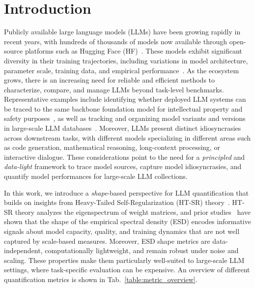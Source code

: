 \section{Introduction}\label{sec:intro}

Publicly available large language models (LLMs) have been growing rapidly in recent years, with hundreds of thousands of models now available through open-source platforms such as Hugging Face (HF)~\citep{zhuang2025embedllm}. These models exhibit significant diversity in their training trajectories, including variations in model architecture, parameter scale, training data, and empirical performance~\citep{horwitz2025Atlas}. As the ecosystem grows, there is an increasing need for reliable and efficient methods to characterize, compare, and manage LLMs beyond task-level benchmarks. Representative examples include identifying whether deployed LLM systems can be traced to the same backbone foundation model for intellectual property and safety purposes~\citep{zhu2025independence}, as well as tracking and organizing model variants and versions in large-scale LLM databases~\citep{horwitz2025TreeHeritage}. Moreover, LLMs present distinct idiosyncrasies across downstream tasks, with different models specializing in different areas such as code generation, mathematical reasoning, long-context processing, or interactive dialogue. These considerations point to the need for a \emph{principled} and \emph{data-light} framework to trace model sources, capture model idiosyncrasies, and quantify model performances for large-scale LLM collections.


In this work, we introduce a \emph{shape}-based perspective for LLM quantification that builds on insights from Heavy-Tailed \- Self-Regularization (HT-SR) theory~\citep{martin2021implicit,martin2020predicting_NatComm,martin2025setol}. HT-SR theory analyzes the eigenspectrum of weight matrices, and prior studies~\cite{yang2022evaluating,martin2020predicting_NatComm} have shown that the shape of the empirical spectral density (ESD) encodes informative signals about model capacity, quality, and training dynamics that are not well captured by scale-based measures. Moreover, ESD shape metrics are data-independent, computationally lightweight, and remain robust under noise and scaling. These properties make them particularly well-suited to large-scale LLM settings, where task-specific evaluation can be expensive. An overview of different quantification metrics is shown in Tab.~\ref{table:metric_overview}.


